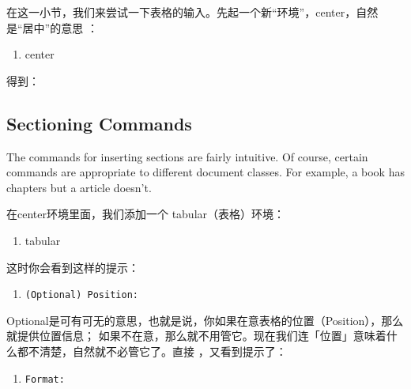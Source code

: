 在这一小节，我们来尝试一下表格的输入。先起一个新“环境”，center，自然是“居中”的意思 ：

\begin{enumerate}
\item[]  center 
\end{enumerate}

得到：

\begin{codeblock}[.9]
\begin{latexcode}
 
  \subsection{Sectioning Commands}
  \label{sec:sectioning-commands}
  
  The commands for inserting sections are fairly intuitive.
  Of course, certain commands are appropriate to different
  document classes. For example, a book has chapters but a
  article doesn't.
  

  \begin{center}
    
  \end{center}
\end{latexcode}
\end{codeblock}

在center环境里面，我们添加一个 tabular（表格）环境：

\begin{enumerate}
\item[]  tabular 
\end{enumerate}

这时你会看到这样的提示：

\begin{enumerate}
\item[] \texttt{(Optional) Position:}
\end{enumerate}

Optional是可有可无的意思，也就是说，你如果在意表格的位置（Position），那么就提供位置信息；
如果不在意，那么就不用管它。现在我们连「位置」意味着什么都不清楚，自然就不必管它了。直接 ，又看到提示了：

\begin{enumerate}
\item[] \texttt{Format:}
\end{enumerate}

